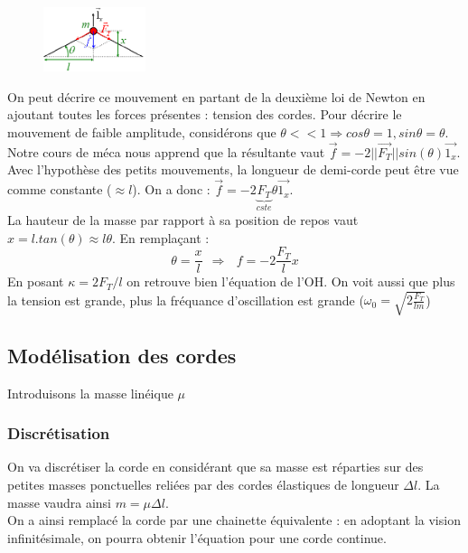 \documentclass	[11pt, a4paper, openany]{book}
\begin{document}
		\begin{figure}
			\includegraphics[width=3cm]{oo/image22.png}
		\end{figure}
		
		On peut décrire ce mouvement en partant de la deuxième loi de Newton en ajoutant toutes les forces présentes : tension des cordes. Pour décrire le mouvement de faible amplitude, considérons que $\theta << 1 \Rightarrow cos\theta = 1, sin\theta = \theta$.\\
		
		Notre cours de méca nous apprend que la résultante vaut $\vec{f} = -2||\vec{F_T}||sin(\theta) \vec{1_x}$. Avec l'hypothèse des petits mouvements, la longueur de demi-corde peut être vue comme constante ($\approx l$). On a donc : $\vec{f} = -2\underbrace{F_T}_{cste}\theta\vec{1_x}$.\\
		La hauteur de la masse par rapport à sa position de repos vaut $x = l.tan(\theta) \approx l\theta$. En remplaçant :
		\begin{equation}
			\theta = \frac{x}{l}\ \ \Rightarrow\ \ \ f = -2\frac{F_T}{l}x
		\end{equation}
		En posant $\kappa = 2F_T/l$ on retrouve bien l'équation de l'OH. On voit aussi que plus la tension est grande, plus la fréquance d'oscillation est grande ($\omega_0 = \sqrt{2\frac{F_T}{lm}}$)
		
		\subsection{Modélisation des cordes}
		Introduisons la masse linéique $\mu$
		\subsubsection{Discrétisation}
		On va discrétiser la corde en considérant que sa masse est réparties sur des petites masses ponctuelles reliées par des cordes élastiques de longueur $\Delta l$. La masse vaudra ainsi $m = \mu\Delta l$.\\
		On a ainsi remplacé la corde par une chainette équivalente : en adoptant la vision infinitésimale, on pourra obtenir l'équation pour une corde continue.
		
\end{document}
